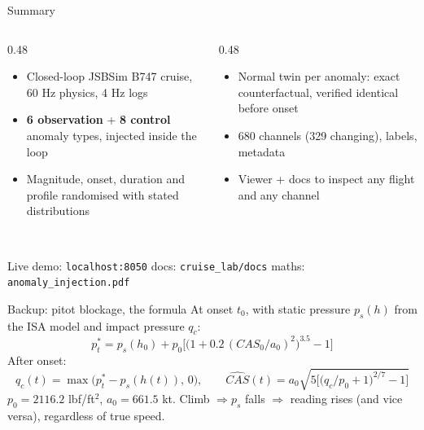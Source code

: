 \documentclass[aspectratio=169,11pt]{beamer}
\newcommand{\obs}[1]{{\color{flight}\textbf{#1}}}
\newcommand{\ctl}[1]{{\color{twin}\textbf{#1}}}
\newcommand{\aside}[1]{{\color{muted}\small #1}}
\begin{document}
\begin{frame}{Summary}
  \begin{columns}[T]
    \begin{column}{0.48\textwidth}
      \begin{itemize}\setlength\itemsep{0.6em}
        \item Closed-loop JSBSim B747 cruise, 60 Hz physics, 4 Hz logs
        \item \obs{6 observation} + \ctl{8 control} anomaly types, injected inside the loop
        \item Magnitude, onset, duration and profile randomised with stated distributions
      \end{itemize}
    \end{column}
    \begin{column}{0.48\textwidth}
      \begin{itemize}\setlength\itemsep{0.6em}
        \item Normal twin per anomaly: exact counterfactual, verified identical before onset
        \item 680 channels (329 changing), labels, metadata
        \item Viewer + docs to inspect any flight and any channel
      \end{itemize}
    \end{column}
  \end{columns}
  \vspace{2em}
  \\[0.6em]
  \aside{Live demo: \texttt{localhost:8050} \textbullet{} docs: \texttt{cruise\_lab/docs} \textbullet{} maths: \texttt{anomaly\_injection.pdf}}
\end{frame}

\appendix
\begin{frame}{Backup: pitot blockage, the formula}
  \small
  At onset $t_0$, with static pressure $p_s(h)$ from the ISA model and impact pressure $q_c$:
  \[ p_t^* = p_s(h_0) + p_0\Big[\big(1 + 0.2\,(CAS_0/a_0)^2\big)^{3.5} - 1\Big] \]
  After onset:
  \[ q_c(t) = \max\big(p_t^* - p_s(h(t)),\,0\big),\qquad \widehat{CAS}(t) = a_0\sqrt{5\Big[\big(q_c/p_0+1\big)^{2/7}-1\Big]} \]
  \aside{$p_0 = 2116.2$ lbf/ft$^2$, $a_0 = 661.5$ kt. Climb $\Rightarrow p_s$ falls $\Rightarrow$ reading rises (and vice versa), regardless of true speed.}
\end{frame}
\end{document}
